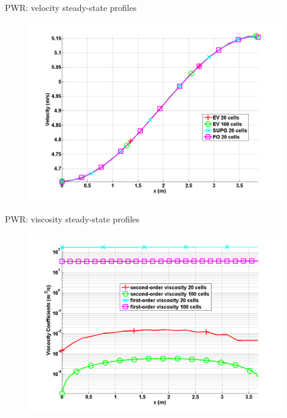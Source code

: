 \documentclass[xcolor=dvipsnames,10pt]{beamer}
\begin{document}
\begin{frame}{PWR: velocity steady-state profiles}
\begin{figure}
    \centering
    \includegraphics[width=0.98\textwidth]{plots/PWR_stt_velocity.png}
\end{figure}
\end{frame}
\begin{frame}{PWR: viscosity steady-state profiles}
\begin{figure}
    \centering
    \includegraphics[width=0.98\textwidth]{plots/PWR_stt_viscosity.png}
\end{figure}
\end{frame}
\end{document}
